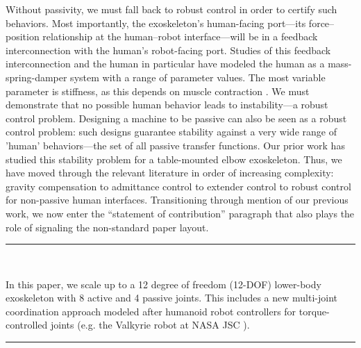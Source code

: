 \documentclass[10pt,letterpaper]{letter}
\newcommand*{\ta}[1]{\textcolor[HTML]{107f10}{#1}}
\newcommand{\paperquote}[1]{%
	\begin{center}
		
		\begin{minipage}{.8\textwidth}
			{\rule{\textwidth}{.5pt}}\vspace{.5em}\\
			\begin{minipage}{\textwidth}\setlength{\parindent}{2em}#1\end{minipage}
			\vspace{.5em}
			{\rule{\textwidth}{.5pt}}
		\end{minipage}%
	\end{center}
}
\begin{document}
\begin{letter}{}
{{	Without passivity, we must fall back to robust control in order to certify such behaviors. 
	Most importantly, the exoskeleton's human-facing port---its force--position relationship at the human--robot interface---will be in a feedback interconnection with the human's robot-facing port.
	Studies of this feedback interconnection \cite{Kazerooni1990TSMC,BuergerHogan2007TRO,BuergerHogan2006IROS,HeThomasPaineSentis2019ACC} and the human in particular \cite{HeHuangThomasSentis2019IROS} have modeled the human as a mass-spring-damper system with a range of parameter values. The most variable parameter is stiffness, as this depends on muscle contraction \cite{Hogan1984TAC}.
	We must demonstrate that no possible human behavior leads to instability---a robust control problem.
	Designing a machine to be passive \cite{ColgateHogan1988IJC,Hogan1989ICRA,ColgateBrown1994ICRA,AdamsHannaford1999TRA} can also be seen as a robust control problem: such designs guarantee stability against a very wide range of 'human' behaviors---the set of all passive transfer functions. Our prior work \cite{ThomasCoholichSentis2019AIM,HeThomasPaineSentis2019ACC,HeHuangThomasSentis2019IROS} has studied this stability problem for a table-mounted elbow exoskeleton.}
}
Thus, we have moved through the relevant literature in order of increasing complexity: gravity compensation to admittance control to extender control to robust control for non-passive human interfaces. Transitioning through mention of our previous work, we now enter the ``statement of contribution'' paragraph that also plays the role of signaling the non-standard paper layout.
\paperquote{
\ta{In this paper, we scale up to a 12 degree of freedom (12-DOF) lower-body exoskeleton with 8 active and 4 passive joints. This includes a new multi-joint coordination approach modeled after humanoid robot controllers for torque-controlled joints \cite{SentisParkKhatib2010TRO,KimEA2016TRO} (e.g. the Valkyrie robot at NASA JSC \cite{RadfordEA2015JFR,PaineEA2015JFR}).}
}
\end{letter}
\end{document}
